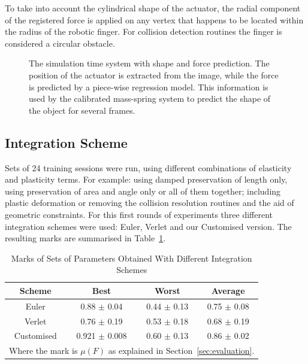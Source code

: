\documentclass[journal]{IEEEtran}
\newcommand{\tref}[1]{Table~\ref{#1}}
\newcommand{\sref}[1]{Section~\ref{#1}}
\begin{document}
To take into account the cylindrical shape of the actuator, the radial component of the registered force is applied on any vertex that happens to be located within the radius of the robotic finger.  For collision detection routines the finger is considered a circular obstacle.

\begin{figure}[!t]
\centering
\setlength\fboxsep{0pt}    %
\setlength\fboxrule{0.5pt} %
\caption{The simulation time system with shape and force prediction.  The position of the actuator is extracted from the image, while the force is predicted by a piece-wise regression model. This information is used by the calibrated mass-spring system to predict the shape of the object for several frames. }\label{fig:diagram}
\end{figure}

\subsection{Integration Scheme}
Sets of 24 training sessions were run, using different combinations of elasticity and plasticity terms.  For example: using damped preservation of length only, using preservation of area and angle only or all of them together;  including plastic deformation or removing the collision resolution routines and the aid of geometric constraints.  For this first rounds of experiments three different integration schemes were used: Euler, Verlet and our Customised version.  The resulting marks are summarised in \tref{tab:ischemes}.

\begin{table}[!t]
\renewcommand{\arraystretch}{1.3}
\caption{Marks of Sets of Parameters Obtained With Different Integration Schemes}
\label{tab:ischemes}
\centering
\begin{tabular}{cccc}
\hline
\bfseries Scheme & \bfseries Best & \bfseries Worst & \bfseries Average \\
\hline\hline
Euler & 0.88 $\pm$ 0.04 & 0.44 $\pm$ 0.13 & 0.75 $\pm$ 0.08 \\
Verlet & 0.76 $\pm$ 0.19 & 0.53 $\pm$ 0.18 & 0.68 $\pm$ 0.19 \\
Customised & 0.921 $\pm$ 0.008 & 0.60 $\pm$ 0.13 & 0.86 $\pm$ 0.02 \\
\hline
\multicolumn{4}{l}{Where the mark is $\mu(F)$ as explained in \sref{sec:evaluation}.}
\end{tabular}
\end{table}
\end{document}
